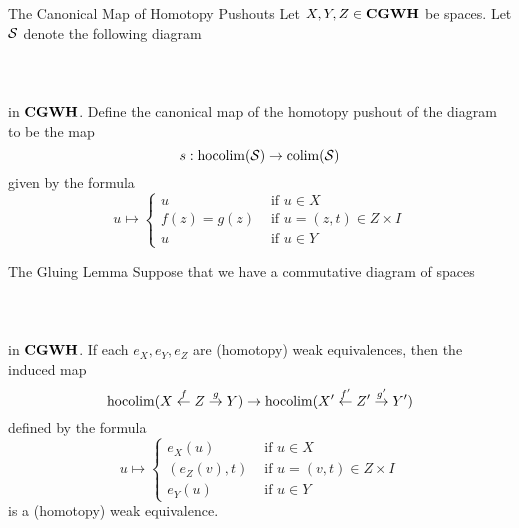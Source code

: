 \documentclass[a4paper]{article}
\begin{document}
\begin{defn}{The Canonical Map of Homotopy Pushouts}{} Let $X,Y,Z\in\bold{CGWH}$ be spaces. Let $\mathcal{S}$ denote the following diagram \\~\\
\\~\\
in $\bold{CGWH}$. Define the canonical map of the homotopy pushout of the diagram to be the map $$s:\operatorname*{hocolim}(\mathcal{S})\to\operatorname*{colim}(\mathcal{S})$$ given by the formula $$u\mapsto\begin{cases}
u & \text{ if }u\in X\\
f(z)=g(z) & \text{ if }u=(z,t)\in Z\times I\\
u & \text{ if }u\in Y
\end{cases}$$
\end{defn}

\begin{thm}{The Gluing Lemma}{} Suppose that we have a commutative diagram of spaces \\~\\
\\~\\
in $\bold{CGWH}$. If each $e_X,e_Y,e_Z$ are (homotopy) weak equivalences, then the induced map $$\operatorname*{hocolim}(X\overset{f}{\leftarrow}Z\overset{g}{\rightarrow}Y)\to\operatorname*{hocolim}(X'\overset{f'}{\leftarrow}Z'\overset{g'}{\rightarrow}Y')$$ defined by the formula $$u\mapsto\begin{cases}
e_X(u) & \text{ if }u\in X\\
(e_Z(v),t) & \text{ if }u=(v,t)\in Z\times I\\
e_Y(u) & \text{ if }u\in Y
\end{cases}$$ is a (homotopy) weak equivalence. 
\end{thm}
\end{document}
